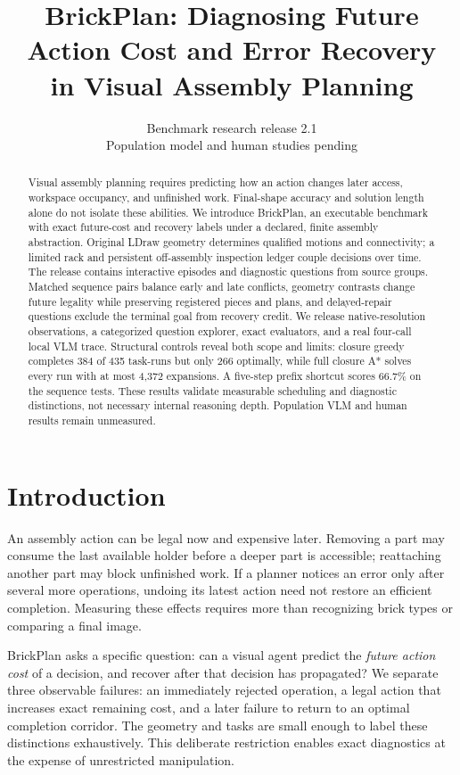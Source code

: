 \documentclass[10pt,twocolumn,letterpaper]{article}
\title{BrickPlan: Diagnosing Future Action Cost and Error Recovery\\in Visual Assembly Planning}
\author{Benchmark research release 2.1\\Population model and human studies pending}
\begin{document}
\maketitle

\begin{abstract}
Visual assembly planning requires predicting how an action changes later
access, workspace occupancy, and unfinished work. Final-shape accuracy and
solution length alone do not isolate these abilities. We introduce
BrickPlan, an executable benchmark with exact future-cost and recovery
labels under a declared, finite assembly abstraction. Original LDraw
geometry determines qualified motions and connectivity; a limited rack
and persistent off-assembly inspection ledger couple decisions over time.
The release contains \EpisodeCount{} interactive episodes and
\ProbeCount{} diagnostic questions from \SourceCount{} source groups.
Matched sequence pairs balance early and late conflicts, geometry
contrasts change future legality while preserving registered pieces and
plans, and delayed-repair questions exclude the terminal goal from
recovery credit. We release native-resolution observations, a categorized
question explorer, exact evaluators, and a real four-call local VLM trace.
Structural controls reveal both scope and limits: closure greedy completes
384 of 435 task-runs but only 266 optimally, while full closure A* solves
every run with at most 4,372 expansions. A five-step prefix shortcut scores
66.7\% on the sequence tests. These results validate measurable scheduling
and diagnostic distinctions, not necessary internal reasoning depth.
Population VLM and human results remain unmeasured.
\end{abstract}

\section{Introduction}
An assembly action can be legal now and expensive later. Removing a part
may consume the last available holder before a deeper part is accessible;
reattaching another part may block unfinished work. If a planner notices
an error only after several more operations, undoing its latest action
need not restore an efficient completion. Measuring these effects requires
more than recognizing brick types or comparing a final image.

BrickPlan asks a specific question: can a visual agent predict the
\emph{future action cost} of a decision, and recover after that decision
has propagated? We separate three observable failures: an immediately
rejected operation, a legal action that increases exact remaining cost,
and a later failure to return to an optimal completion corridor.
The geometry and tasks are small enough to label these distinctions
exhaustively. This deliberate restriction enables exact diagnostics
at the expense of unrestricted manipulation.
\end{document}
